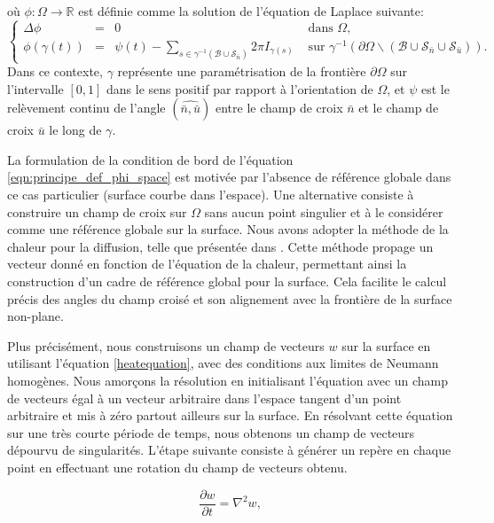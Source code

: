 où $\phi:\Omega\longrightarrow\mathbb{R}$ est définie comme la solution de l'équation de Laplace suivante:
\begin{equation}
\left\{
\begin{array}{lcll}
\Delta\phi &=& 0 &\mbox{ dans }\Omega,\\[0.5cm]
\phi(\gamma(t))&=&\psi(t)-\displaystyle\sum_{s\in\gamma^{-1}(\mathcal{B}\cup\mathcal{S}_{\bar{n}})}2\pi I_{\gamma(s)}& \mbox{ sur } \gamma^{-1}(\partial\Omega\backslash(\mathcal{B}\cup\mathcal{S}_{\bar{n}}\cup\mathcal{S}_{\bar{u}})).
\end{array}
\right.
\label{eqn:principe_def_phi_space}
\end{equation}
Dans ce contexte, $\gamma$ représente une paramétrisation de la frontière $\partial\Omega$ sur l'intervalle $[0, 1]$ dans le sens positif par rapport à l'orientation de $\Omega$, et $\psi$ est le relèvement continu de l'angle $(\widehat{\bar{n}, \bar{u}})$ entre le champ de croix $\bar{n}$ et le champ de croix $\bar{u}$ le long de $\gamma$.

La formulation de la condition de bord de l'équation \ref{eqn:principe_def_phi_space} est motivée par l'absence de référence globale dans ce cas particulier (surface courbe dans l'espace). Une alternative consiste à construire un champ de croix sur $\Omega$ sans aucun point singulier et à le considérer comme une référence globale sur la surface. Nous avons adopter la méthode de la chaleur pour la diffusion, telle que présentée dans \cite{sharp2019vector}. Cette méthode propage un vecteur donné en fonction de l'équation de la chaleur, permettant ainsi la construction d'un cadre de référence global pour la surface. Cela facilite le calcul précis des angles du champ croisé et son alignement avec la frontière de la surface non-plane.

Plus précisément, nous construisons un champ de vecteurs $w$ sur la surface en utilisant l'équation \eqref{heatequation}, avec des conditions aux limites de Neumann homogènes. Nous amorçons la résolution en initialisant l'équation avec un champ de vecteurs égal à un vecteur arbitraire dans l'espace tangent d'un point arbitraire et mis à zéro partout ailleurs sur la surface. En résolvant cette équation sur une très courte période de temps, nous obtenons un champ de vecteurs dépourvu de singularités. L'étape suivante consiste à générer un repère en chaque point en effectuant une rotation du champ de vecteurs obtenu.

\begin{equation}
\label{heatequation}
\frac{\partial w}{\partial t} = \nabla^2 w,
\end{equation}


